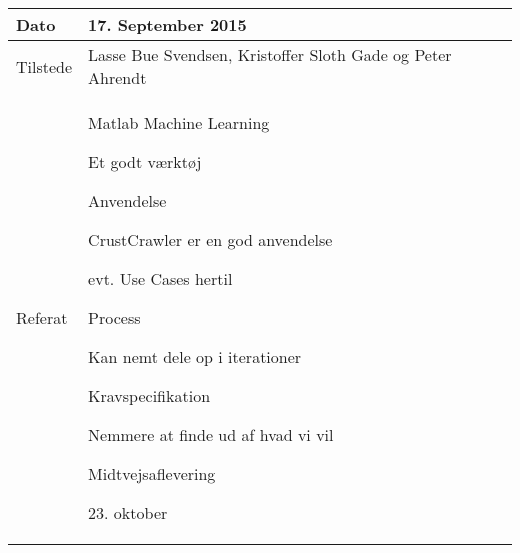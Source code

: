 \begin{center}
	\begin{tabular}{| l | p{10cm} |}
		\hline
		Dato		& 17. September 2015\\ \hline
		Tilstede 	& Lasse Bue Svendsen, Kristoffer Sloth Gade og Peter Ahrendt\\ \hline
		Referat		& \vspace{-5mm}\begin{myEnumerate}
			\item Matlab Machine Learning
			\begin{myItemize}				
				\item Et godt værktøj
			\end{myItemize}
			\item Anvendelse
			\begin{myItemize}
				\item CrustCrawler er en god anvendelse
				\item evt. Use Cases hertil
			\end{myItemize}
			\item Process
			\begin{myItemize}
				\item Kan nemt dele op i iterationer
			\end{myItemize}
			\item Kravspecifikation
			\begin{myItemize}
				\item Nemmere at finde ud af hvad vi vil
			\end{myItemize}
			\item Midtvejsaflevering
			\begin{myItemize}
				\item 23. oktober
			\end{myItemize}
		\end{myEnumerate}\\	
		\hline
	\end{tabular}
\end{center}

